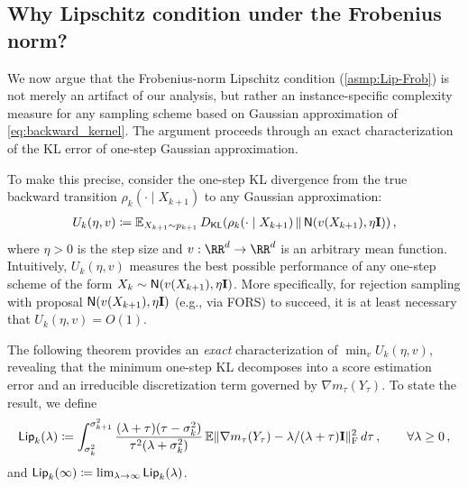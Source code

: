 \subsection{Why Lipschitz condition under the Frobenius norm?}\label{ssec:why-Frob}


\newcommand{\step}{\eta'}
\newcommand{\Comp}{\mathsf{Lip}}

We now argue that the Frobenius-norm Lipschitz condition (\cref{asmp:Lip-Frob}) is not merely an artifact of our analysis, but rather an instance-specific complexity measure for any sampling scheme based on Gaussian approximation of \eqref{eq:backward_kernel}. The argument proceeds through an exact characterization of the KL error of one-step Gaussian approximation.

To make this precise, consider the one-step KL divergence from the true backward transition $\rho_k(\cdot\mid X_{k+1})$ to any Gaussian approximation:
\begin{align*}
    U_k(\eta, v)\deq \En_{X_{k+1}\sim p_{k+1}}\Dkl{\rho_k(\cdot\mid X_{k+1})}{\normal{v(X_{k+1}),\eta\Id}}\,,
\end{align*}
where $\eta>0$ is the step size and $v:\RR^d\to\RR^d$ is an arbitrary mean function. Intuitively, $U_k(\eta, v)$ measures the best possible performance of any one-step scheme of the form $X_k\sim \normal{v(X_{k+1}),\eta\Id}$. More specifically, for rejection sampling with proposal $\normal{v(X_{k+1}),\eta\Id}$ (e.g., via FORS) to succeed, it is at least necessary that $U_k(\eta, v)=O(1)$.

The following theorem provides an \emph{exact} characterization of $\min_v U_k(\eta, v)$, revealing that the minimum one-step KL decomposes into a score estimation error and an irreducible discretization term governed by $\nabla m_\tau(Y_\tau)$. To state the result, we define
\begin{align*}
    \Comp_k(\lambda)\deq \int_{\sigma_k^2}^{\sigma_{k+1}^2} \frac{(\lambda+\tau)(\tau-\sigma_k^2)}{\tau^2(\lambda+\sigma_k^2)} \En\nrmF{\nabla m_\tau(Y_\tau)-\lambda/(\lambda+\tau)\Id}^2\, d\tau\,, \qquad \forall \lambda\geq 0\,,
\end{align*}
and $\Comp_k(\infty)\deq \lim_{\lambda\to\infty} \Comp_k(\lambda)$.



